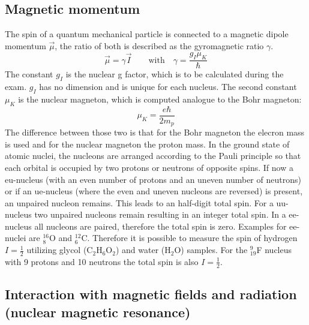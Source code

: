 \subsection{Magnetic momentum}
The spin of a quantum mechanical particle is connected to a magnetic dipole momentum $\vec{\mu}$, the ratio of both is described as the gyromagnetic ratio $\gamma$.
$$\vec{\mu}=\gamma\vec{I}\qquad \textrm{with}\quad \gamma = \frac{g_I\mu_K}{\hbar}$$
The constant $g_I$ is the nuclear g factor, which is to be calculated during the exam. $g_I$ has no dimension and is unique for each nucleus. The second constant $\mu_K$ is the nuclear magneton, which is computed analogue to the Bohr magneton:
$$\mu_K = \frac{e\hbar}{2m_p}$$
The difference between those two is that for the Bohr magneton the elecron mass is used and for the nuclear magneton the proton mass. 
In the ground state of atomic nuclei, the nucleons are arranged according to the Pauli principle so that each orbital is occupied by two protons or neutrons of opposite spins. If now a eu-nucleus (with an even number of protons and an uneven number of neutrons) or if an ue-nucleus (where the even and uneven nucleons are reversed) is present, an unpaired nucleon remains. This leads to an half-digit total spin. For a uu-nucleus two unpaired nucleons remain resulting in an integer total spin. In a ee-nucleus all nucleons are paired, therefore the total spin is zero. Examples for ee-nuclei are $^{16}_{8}$O and $^{12}_6$C. Therefore it is possible to measure the spin of hydrogen $I=\frac{1}{2}$ utilizing glycol (C$_2$H$_6$O$_2$) and water (H$_2$O) samples. For the $^{9}_{19}$F nucleus with 9 protons and 10 neutrons the total spin is also $I=\frac{1}{2}$.
\subsection{Interaction with magnetic fields and radiation (nuclear magnetic resonance)}
